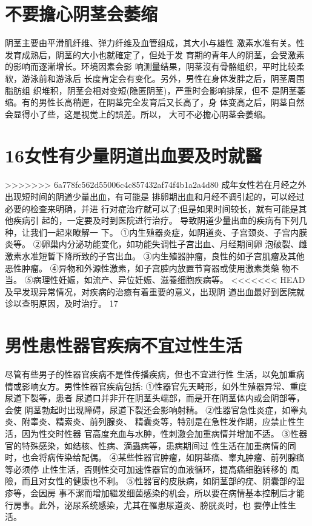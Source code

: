 \documentclass[12pt,UTF8]{ctexbook}
\begin{document}
\section{不要擔心阴茎会萎缩}
阴茎主要由平滑肌纤维、弹力纤维及血管组成，其大小与雄性
激素水准有关。性发育成熟后，阴茎的大小也就確定了，但处于发
育期的青年人的阴茎，会受激素的影响而逐漸增长。环境因素会影
响测量结果，阴茎沒有骨骼组织，平时比较柔软，游泳前和游泳后
长度肯定会有变化。另外，男性在身体发胖之后，阴茎周围脂肪组
织堆积，阴茎会相对变短(隐匿阴茎)，严重时会影响排尿，但不
是阴茎萎缩。有的男性长高稍遲，在阴茎完全发育后又长高了，身
体变高之后，阴茎自然会显得小了些，这是视觉上的誤差。所以，
大可不必擔心阴茎会萎缩。
\section{16女性有少量阴道出血要及时就醫}
>>>>>>> 6a778fc562d55006c4c857432af74f4b1a2a4d80
成年女性若在月经之外出现短时间的阴道少量出血，有可能是
排卵期出血和月经不调引起的，可以经过必要的检查来明确，并进
行对症治疗就可以了;但是如果时间较长，就有可能是其他疾病引
起的，一定要及时到医院进行治疗。
导致阴道少量出血的疾病有下列几种，让我们一起来瞭解一
下。
①内生殖器炎症，如阴道炎、子宫颈炎、子宫内膜炎等。
②卵巢内分泌功能变化，如功能失调性子宫出血、月经期间卵
泡破裂、雌激素水准短暫下降所致的子宫出血。
③内生殖器肿瘤，良性的如子宫肌瘤及其他恶性肿瘤。
④异物和外源性激素，如子宫腔内放置节育器或使用激素类藥
物不当。
⑤病理性妊娠，如流产、异位妊娠、滋養细胞疾病等。
<<<<<<< HEAD
及早发现异常情况，对疾病的治癒有着重要的意义，出现阴
道出血最好到医院就诊以查明原因，及时治疗。
17
\section{男性患性器官疾病不宜过性生活}
尽管有些男子的性器官疾病不是性传播疾病，但也不宜进行性
生活，以免加重病情或影响女方。男性性器官疾病包括:
①性器官先天畸形，如外生殖器异常、重度尿道下裂等，患者
尿道口并非开在阴茎头端部，而是开在阴茎体内或会阴部等，会使
阴茎勃起时出现障碍，尿道下裂还会影响射精。
②性器官急性炎症，如睾丸炎、附睾炎、精索炎、前列腺炎、
精囊炎等，特別是在急性发作期，应禁止性生活，因为性交时性器
官高度充血与水肿，性刺激会加重病情并增加不适。
③性器官的特殊感染，如结核、性病、滴蟲病等，患病期间过
性生活在加重病情的同时，也会将病传染给配偶。
④某些性器官肿瘤，如阴茎癌、睾丸肿瘤、前列腺癌等必须停
止性生活，否则性交可加速性器官的血液循环，提高癌细胞转移的
風險，而且对女性的健康也不利。
⑤性器官的皮肤病，如阴茎部的疣、阴囊部的湿疹等，会因房
事不潔而增加繼发细菌感染的机会，所以要在病情基本控制后才能
行房事。此外，泌尿系统感染，尤其在罹患尿道炎、膀胱炎时，也
要停止性生活。
\end{document}
